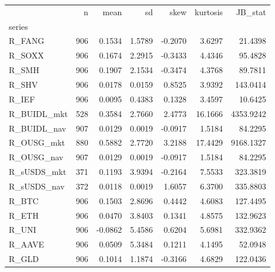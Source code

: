 \begin{tabular}{lrrrrrr}
\toprule
 & n & mean & sd & skew & kurtosis & JB\_stat \\
series &  &  &  &  &  &  \\
\midrule
R\_FANG & 906 & 0.1534 & 1.5789 & -0.2070 & 3.6297 & 21.4398 \\
R\_SOXX & 906 & 0.1674 & 2.2915 & -0.3433 & 4.4346 & 95.4828 \\
R\_SMH & 906 & 0.1907 & 2.1534 & -0.3474 & 4.3768 & 89.7811 \\
R\_SHV & 906 & 0.0178 & 0.0159 & 0.8525 & 3.9392 & 143.0414 \\
R\_IEF & 906 & 0.0095 & 0.4383 & 0.1328 & 3.4597 & 10.6425 \\
R\_BUIDL\_mkt & 528 & 0.3584 & 2.7660 & 2.4773 & 16.1666 & 4353.9242 \\
R\_BUIDL\_nav & 907 & 0.0129 & 0.0019 & -0.0917 & 1.5184 & 84.2295 \\
R\_OUSG\_mkt & 880 & 0.5882 & 2.7720 & 3.2188 & 17.4429 & 9168.1327 \\
R\_OUSG\_nav & 907 & 0.0129 & 0.0019 & -0.0917 & 1.5184 & 84.2295 \\
R\_sUSDS\_mkt & 371 & 0.1193 & 3.9394 & -0.2164 & 7.5533 & 323.3819 \\
R\_sUSDS\_nav & 372 & 0.0118 & 0.0019 & 1.6057 & 6.3700 & 335.8803 \\
R\_BTC & 906 & 0.1503 & 2.8696 & 0.4442 & 4.6083 & 127.4495 \\
R\_ETH & 906 & 0.0470 & 3.8403 & 0.1341 & 4.8575 & 132.9623 \\
R\_UNI & 906 & -0.0862 & 5.4586 & 0.6204 & 5.6981 & 332.9362 \\
R\_AAVE & 906 & 0.0509 & 5.3484 & 0.1211 & 4.1495 & 52.0948 \\
R\_GLD & 906 & 0.1014 & 1.1874 & -0.3166 & 4.6829 & 122.0436 \\
\bottomrule
\end{tabular}
